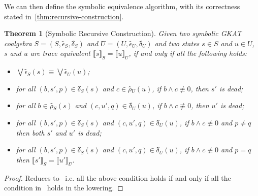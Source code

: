 \documentclass[conference]{IEEEtran}
\newtheorem{theorem}{Theorem}
\begin{document}
We can then define the symbolic equivalence algorithm, with its correctness stated in~\cref{thm:recursive-construction}.

\begin{theorem}[Symbolic Recursive Construction]\label{thm:symb-recursive-construction}
    Given two symbolic GKAT coalgebra \(Ŝ = (S, ϵ̂_S, δ̂_S)\) and \(Û = (U, ϵ̂_U, δ̂_U)\) and two states \(s ∈ S\) and \(u ∈ U\), \(s\) and \(u\) are trace equivalent \(⟦s⟧_{Ŝ} = ⟦u⟧_{Û}\), if and only if all the following holds:
    \begin{itemize}
        \item \(⋁ ϵ̂_S(s) ≡ ⋁ ϵ̂_U(u)\); 
        \item for all \((b, s', p) ∈ δ̂_S(s)\) and \(c ∈ ρ̂_U(u)\), if \(b ∧ c ≢ 0\), then \(s'\) is dead;
        \item for all \(b ∈ ρ̂_S(s)\) and \((c, u', q) ∈ δ̂_U(u)\), if \(b ∧ c ≢ 0\), then \(u'\) is dead;
        \item for all \((b, s', p) ∈ δ̂_S(s)\) and \((c, u', q) ∈ δ̂_U(u)\), if \(b ∧ c ≢ 0\) and \(p ≠ q\) then both \(s'\) and \(u'\) is dead; 
        \item for all \((b, s', p) ∈ δ̂_S(s)\) and \((c, u', q) ∈ δ̂_U(u)\), if \(b ∧ c ≢ 0\) and \(p = q\) then \(⟦s'⟧_{Ŝ} = ⟦u'⟧_{Û}\).
    \end{itemize}
\end{theorem}

\begin{proof}
    Reduces to~ i.e. all the above condition holds if and only if all the condition in~ holds in the lowering.
\end{proof}
\end{document}
